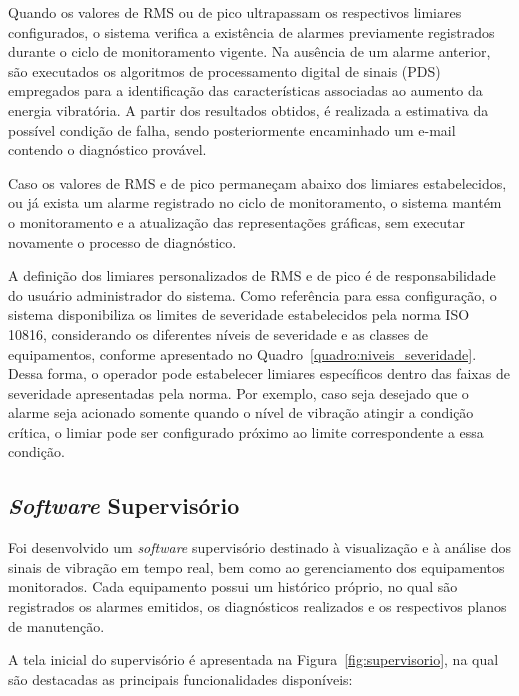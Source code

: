 \documentclass[conference]{IEEEtran}
\begin{document}
Quando os valores de RMS ou de pico ultrapassam os respectivos limiares configurados, o sistema verifica a existência de alarmes previamente registrados durante o ciclo de monitoramento vigente. Na ausência de um alarme anterior, são executados os algoritmos de processamento digital de sinais (PDS) empregados para a identificação das características associadas ao aumento da energia vibratória. A partir dos resultados obtidos, é realizada a estimativa da possível condição de falha, sendo posteriormente encaminhado um e-mail contendo o diagnóstico provável.

Caso os valores de RMS e de pico permaneçam abaixo dos limiares estabelecidos, ou já exista um alarme registrado no ciclo de monitoramento, o sistema mantém o monitoramento e a atualização das representações gráficas, sem executar novamente o processo de diagnóstico.

A definição dos limiares personalizados de RMS e de pico é de responsabilidade do usuário administrador do sistema. Como referência para essa configuração, o sistema disponibiliza os limites de severidade estabelecidos pela norma ISO 10816, considerando os diferentes níveis de severidade e as classes de equipamentos, conforme apresentado no Quadro~\ref{quadro:niveis_severidade}. Dessa forma, o operador pode estabelecer limiares específicos dentro das faixas de severidade apresentadas pela norma. Por exemplo, caso seja desejado que o alarme seja acionado somente quando o nível de vibração atingir a condição crítica, o limiar pode ser configurado próximo ao limite correspondente a essa condição.

\subsection{\textit{Software} Supervisório}

Foi desenvolvido um \textit{software} supervisório destinado à visualização e à análise dos sinais de vibração em tempo real, bem como ao gerenciamento dos equipamentos monitorados. Cada equipamento possui um histórico próprio, no qual são registrados os alarmes emitidos, os diagnósticos realizados e os respectivos planos de manutenção.

A tela inicial do supervisório é apresentada na Figura~\ref{fig:supervisorio}, na qual são destacadas as principais funcionalidades disponíveis:
\end{document}
